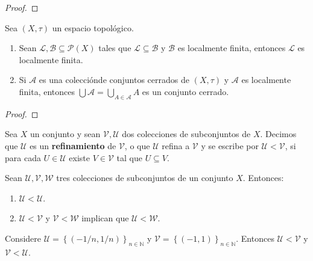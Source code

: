 \documentclass[12pt]{report}
\newcounter{it}
\theoremstyle{largebreak}
\begin{document}
    \begin{proof}
    \end{proof}

    \begin{cor}
        Sea $(X,\tau)$ un espacio topológico.
        \begin{enumerate}
            \item Sean $\mathcal{L},\mathcal{B}\subseteq\mathcal{P}(X)$ tales que $\mathcal{L}\subseteq\mathcal{B}$ y $\mathcal{B}$ es localmente finita, entonces $\mathcal{L}$ es localmente finita.
            \item Si $\mathcal{A}$ es una colecciónde conjuntos cerrados de $(X,\tau)$ y $\mathcal{A}$ es localmente finita, entonces $\bigcup\mathcal{A}=\bigcup_{A\in\mathcal{A}}A$ es un conjunto cerrado.
        \end{enumerate}
    \end{cor}

    \begin{proof}
    \end{proof}

    \begin{mydef}
        Sea $X$ un conjunto y sean $\mathcal{V},\mathcal{U}$ dos colecciones de subconjuntos de $X$. Decimos que $\mathcal{U}$ es un \textbf{refinamiento} de $\mathcal{V}$, o que $\mathcal{U}$ refina a $\mathcal{V}$ y se escribe por $\mathcal{U}<\mathcal{V}$, si para cada $U\in\mathcal{U}$ existe $V\in\mathcal{V}$ tal que $U\subseteq V$.
    \end{mydef}

    \begin{obs}
        Sean $\mathcal{U},\mathcal{V},\mathcal{W}$ tres colecciones de subconjuntos de un conjunto $X$. Entonces:
        \begin{enumerate}
            \item $\mathcal{U}<\mathcal{U}$.
            \item $\mathcal{U}<\mathcal{V}$ y $\mathcal{V}<\mathcal{W}$ implican que $\mathcal{U}<\mathcal{W}$.
        \end{enumerate}
    \end{obs}

    \begin{exa}
        Considere $\mathcal{U}=\left\{(-1/n,1/n) \right\}_{ n\in\mathbb{N}}$ y $\mathcal{V}=\left\{(-1,1) \right\}_{ n\in\mathbb{N}}$. Entonces $\mathcal{U}<\mathcal{V}$ y $\mathcal{V}<\mathcal{U}$.
    \end{exa}
\end{document}
